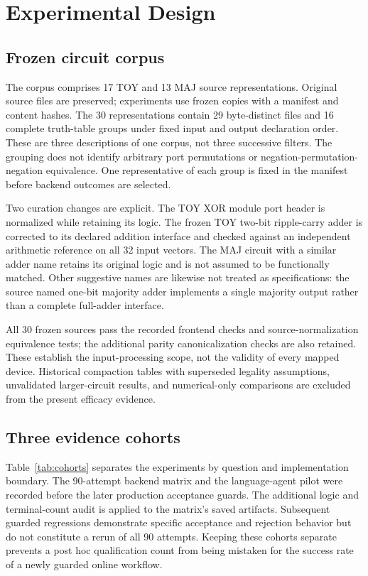 \documentclass[ASNA,twocolumn]{USG}
\begin{document}
\section{Experimental Design}\label{sec:experiments}
\subsection{Frozen circuit corpus}
The corpus comprises 17 TOY and 13 MAJ source representations. Original source files are preserved; experiments use frozen copies with a manifest and content hashes. The 30 representations contain 29 byte-distinct files and 16 complete truth-table groups under fixed input and output declaration order. These are three descriptions of one corpus, not three successive filters. The grouping does not identify arbitrary port permutations or negation-permutation-negation equivalence. One representative of each group is fixed in the manifest before backend outcomes are selected.

Two curation changes are explicit. The TOY XOR module port header is normalized while retaining its logic. The frozen TOY two-bit ripple-carry adder is corrected to its declared addition interface and checked against an independent arithmetic reference on all 32 input vectors. The MAJ circuit with a similar adder name retains its original logic and is not assumed to be functionally matched. Other suggestive names are likewise not treated as specifications: the source named one-bit majority adder implements a single majority output rather than a complete full-adder interface.

All 30 frozen sources pass the recorded frontend checks and source-normalization equivalence tests; the additional parity canonicalization checks are also retained. These establish the input-processing scope, not the validity of every mapped device. Historical compaction tables with superseded legality assumptions, unvalidated larger-circuit results, and numerical-only comparisons are excluded from the present efficacy evidence.

\subsection{Three evidence cohorts}
Table~\ref{tab:cohorts} separates the experiments by question and implementation boundary. The 90-attempt backend matrix and the language-agent pilot were recorded before the later production acceptance guards. The additional logic and terminal-count audit is applied to the matrix's saved artifacts. Subsequent guarded regressions demonstrate specific acceptance and rejection behavior but do not constitute a rerun of all 90 attempts. Keeping these cohorts separate prevents a post hoc qualification count from being mistaken for the success rate of a newly guarded online workflow.
\end{document}
